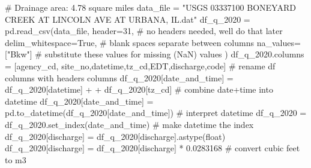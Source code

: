 \documentclass[
  letterpaper,
  DIV=11,
  numbers=noendperiod]{scrreprt}
\newenvironment{Shaded}{\begin{snugshade}}{\end{snugshade}}
\newcommand{\BuiltInTok}[1]{\textcolor[rgb]{0.00,0.23,0.31}{#1}}
\newcommand{\CommentTok}[1]{\textcolor[rgb]{0.37,0.37,0.37}{#1}}
\newcommand{\DecValTok}[1]{\textcolor[rgb]{0.68,0.00,0.00}{#1}}
\newcommand{\FloatTok}[1]{\textcolor[rgb]{0.68,0.00,0.00}{#1}}
\newcommand{\NormalTok}[1]{\textcolor[rgb]{0.00,0.23,0.31}{#1}}
\newcommand{\OperatorTok}[1]{\textcolor[rgb]{0.37,0.37,0.37}{#1}}
\newcommand{\StringTok}[1]{\textcolor[rgb]{0.13,0.47,0.30}{#1}}
\newcommand{\VariableTok}[1]{\textcolor[rgb]{0.07,0.07,0.07}{#1}}
\begin{document}
\begin{Shaded}
\begin{Highlighting}[]
\CommentTok{\# Drainage area: 4.78 square miles   }
\NormalTok{data\_file }\OperatorTok{=} \StringTok{"USGS 03337100 BONEYARD CREEK AT LINCOLN AVE AT URBANA, IL.dat"}
\NormalTok{df\_q\_2020 }\OperatorTok{=}\NormalTok{ pd.read\_csv(data\_file,}
\NormalTok{                        header}\OperatorTok{=}\DecValTok{31}\NormalTok{,                      }\CommentTok{\# no headers needed, we\textquotesingle{}ll do that later}
\NormalTok{                        delim\_whitespace}\OperatorTok{=}\VariableTok{True}\NormalTok{,            }\CommentTok{\# blank spaces separate between columns}
\NormalTok{                        na\_values}\OperatorTok{=}\NormalTok{[}\StringTok{"Bkw"}\NormalTok{]  }\CommentTok{\# substitute these values for missing (NaN) values}
\NormalTok{                )}
\NormalTok{df\_q\_2020.columns }\OperatorTok{=}\NormalTok{ [}\StringTok{\textquotesingle{}agency\_cd\textquotesingle{}}\NormalTok{, }\StringTok{\textquotesingle{}site\_no\textquotesingle{}}\NormalTok{,}\StringTok{\textquotesingle{}datetime\textquotesingle{}}\NormalTok{,}\StringTok{\textquotesingle{}tz\_cd\textquotesingle{}}\NormalTok{,}\StringTok{\textquotesingle{}EDT\textquotesingle{}}\NormalTok{,}\StringTok{\textquotesingle{}discharge\textquotesingle{}}\NormalTok{,}\StringTok{\textquotesingle{}code\textquotesingle{}}\NormalTok{]                       }\CommentTok{\# rename df columns with headers columns}
\NormalTok{df\_q\_2020[}\StringTok{\textquotesingle{}date\_and\_time\textquotesingle{}}\NormalTok{] }\OperatorTok{=}\NormalTok{ df\_q\_2020[}\StringTok{\textquotesingle{}datetime\textquotesingle{}}\NormalTok{] }\OperatorTok{+} \StringTok{\textquotesingle{} \textquotesingle{}} \OperatorTok{+}\NormalTok{ df\_q\_2020[}\StringTok{\textquotesingle{}tz\_cd\textquotesingle{}}\NormalTok{] }\CommentTok{\# combine date+time into datetime}
\NormalTok{df\_q\_2020[}\StringTok{\textquotesingle{}date\_and\_time\textquotesingle{}}\NormalTok{] }\OperatorTok{=}\NormalTok{ pd.to\_datetime(df\_q\_2020[}\StringTok{\textquotesingle{}date\_and\_time\textquotesingle{}}\NormalTok{])        }\CommentTok{\# interpret datetime}
\NormalTok{df\_q\_2020 }\OperatorTok{=}\NormalTok{ df\_q\_2020.set\_index(}\StringTok{\textquotesingle{}date\_and\_time\textquotesingle{}}\NormalTok{)                          }\CommentTok{\# make datetime the index}
\NormalTok{df\_q\_2020[}\StringTok{\textquotesingle{}discharge\textquotesingle{}}\NormalTok{] }\OperatorTok{=}\NormalTok{ df\_q\_2020[}\StringTok{\textquotesingle{}discharge\textquotesingle{}}\NormalTok{].astype(}\BuiltInTok{float}\NormalTok{)}
\NormalTok{df\_q\_2020[}\StringTok{\textquotesingle{}discharge\textquotesingle{}}\NormalTok{] }\OperatorTok{=}\NormalTok{ df\_q\_2020[}\StringTok{\textquotesingle{}discharge\textquotesingle{}}\NormalTok{] }\OperatorTok{*} \FloatTok{0.0283168} \CommentTok{\# convert cubic feet to m3}


\end{Highlighting}
\end{Shaded}
\end{document}
